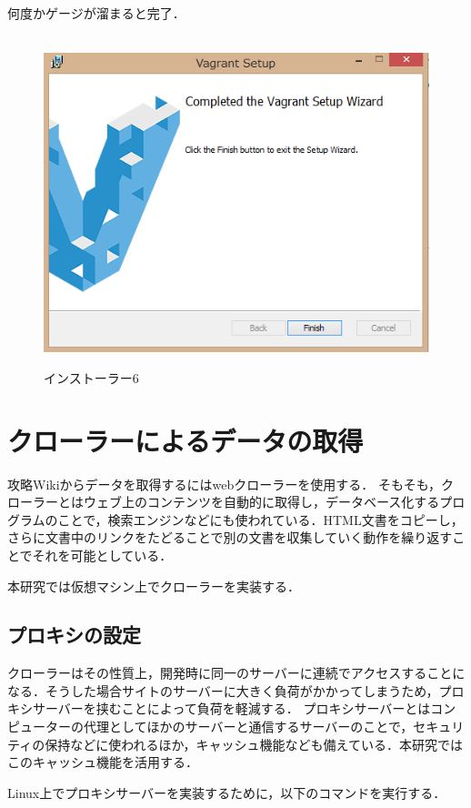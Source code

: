 何度かゲージが溜まると完了．
\begin{figure}[htbp]
\centering　
\includegraphics[width=13cm]{vagrant8.png}
\caption{インストーラー6}
\end{figure}

\section{クローラーによるデータの取得}

攻略Wikiからデータを取得するにはwebクローラーを使用する． 
そもそも，クローラーとはウェブ上のコンテンツを自動的に取得し，データベース化するプログラムのことで，検索エンジンなどにも使われている．HTML文書をコピーし，さらに文書中のリンクをたどることで別の文書を収集していく動作を繰り返すことでそれを可能としている．

本研究では仮想マシン上でクローラーを実装する．

\subsection{プロキシの設定}

クローラーはその性質上，開発時に同一のサーバーに連続でアクセスすることになる．そうした場合サイトのサーバーに大きく負荷がかかってしまうため，プロキシサーバーを挟むことによって負荷を軽減する．
プロキシサーバーとはコンピューターの代理としてほかのサーバーと通信するサーバーのことで，セキュリティの保持などに使われるほか，キャッシュ機能なども備えている．本研究ではこのキャッシュ機能を活用する．

Linux上でプロキシサーバーを実装するために，以下のコマンドを実行する．

